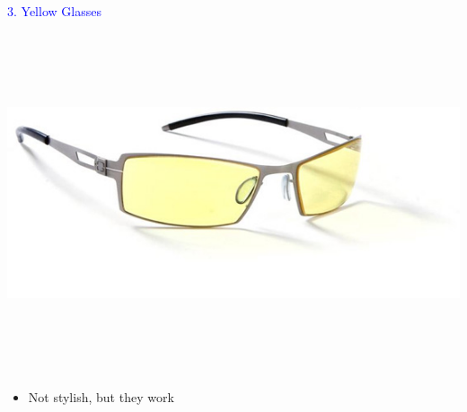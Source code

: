\documentclass[landscape]{slides}
\begin{document}
\begin{slide}

    \textcolor{blue}{\Large{3. Yellow Glasses}}

    \begin{center}
        \includegraphics[height=10cm]{gunnars}
    \end{center}

    \begin{itemize}
        \item Not stylish, but they work
    \end{itemize}

\end{slide}
\end{document}

